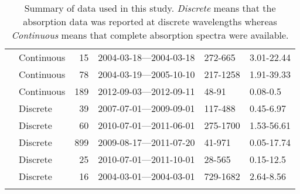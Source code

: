 \begin{longtable}{llrcll}
  \citet{Stedmon2007a} & Continuous &  15 & 2004-03-18---2004-03-18 & 272-665 & 3.01-22.44 \\ 
  \citet{Stedmon2011} & Continuous &  78 & 2004-03-19---2005-10-10 & 217-1258 & 1.91-39.33 \\ 
  \citet{Stedmon2015} & Continuous & 189 & 2012-09-03---2012-09-11 & 48-91 & 0.08-0.5 \\ 
  \citet{Tehrani2013} & Discrete &  39 & 2007-07-01---2009-09-01 & 117-488 & 0.45-6.97 \\ 
  \citet{Wagner2015} & Discrete &  60 & 2010-07-01---2011-06-01 & 275-1700 & 1.53-56.61 \\ 
  \citet{Werdell2003} & Discrete & 899 & 2009-08-17---2011-07-20 & 41-971 & 0.05-17.74 \\ 
  \citet{Yang2013a} & Discrete &  25 & 2010-07-01---2011-10-01 & 28-565 & 0.15-12.5 \\ 
  \citet{Zhang2005} & Discrete &  16 & 2004-03-01---2004-03-01 & 729-1682 & 2.64-8.56 \\ 
   \hline
\hline
\caption{Summary of data used in this study. \textit{Discrete} means that the 
absorption data was reported at discrete wavelengths whereas 
\textit{Continuous} means that complete absorption spectra were available.} 
\end{longtable}
\endgroup
